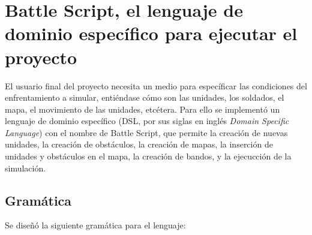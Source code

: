 \section{Battle Script, el lenguaje de dominio específico para ejecutar el proyecto}

El usuario final del proyecto necesita un medio para específicar las condiciones del enfrentamiento a simular, entiéndase cómo son las unidades, los soldados, el mapa, el movimiento de las unidades, etcétera. Para ello se implementó un lenguaje de dominio específico (DSL, por sus siglas en inglés \textit{Domain Specific Language}) con el nombre de Battle Script, que permite la creación de nuevas unidades, la creación de obstáculos, la creación de mapas, la inserción de unidades y obstáculos en el mapa, la creación de bandos, y la ejecucción de la simulación.

\subsection{Gramática}

Se diseñó la siguiente gramática para el lenguaje:


